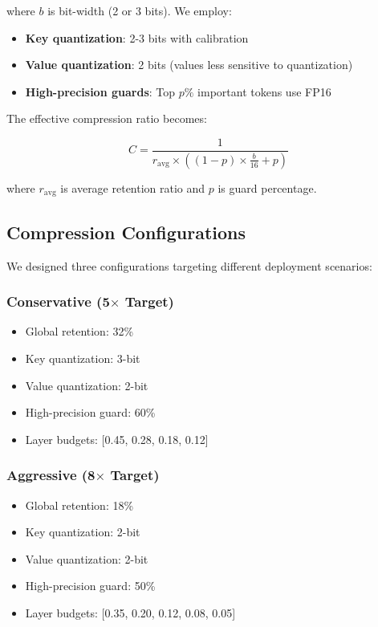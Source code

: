 \documentclass{article}
\begin{document}
where $b$ is bit-width (2 or 3 bits). We employ:

\begin{itemize}
\item \textbf{Key quantization}: 2-3 bits with calibration
\item \textbf{Value quantization}: 2 bits (values less sensitive to quantization)
\item \textbf{High-precision guards}: Top $p\%$ important tokens use FP16
\end{itemize}

The effective compression ratio becomes:

\begin{equation}
C = \frac{1}{r_{\text{avg}} \times \left((1-p) \times \frac{b}{16} + p\right)}
\end{equation}

where $r_{\text{avg}}$ is average retention ratio and $p$ is guard percentage.

\subsection{Compression Configurations}

We designed three configurations targeting different deployment scenarios:

\subsubsection{Conservative (5$\times$ Target)}
\begin{itemize}
\item Global retention: 32\%
\item Key quantization: 3-bit
\item Value quantization: 2-bit
\item High-precision guard: 60\%
\item Layer budgets: [0.45, 0.28, 0.18, 0.12]
\end{itemize}

\subsubsection{Aggressive (8$\times$ Target)}
\begin{itemize}
\item Global retention: 18\%
\item Key quantization: 2-bit
\item Value quantization: 2-bit
\item High-precision guard: 50\%
\item Layer budgets: [0.35, 0.20, 0.12, 0.08, 0.05]
\end{itemize}
\end{document}
